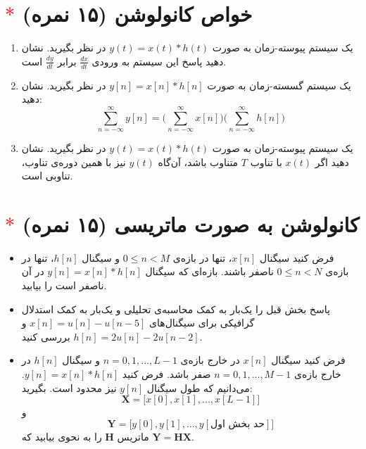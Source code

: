 \documentclass[a4paper]{article}
\begin{document}
	\large
	
	\section{ \textcolor{red}{$\ast$} 
		خواص کانولوشن (۱۵ نمره)
	}
	\begin{enumerate}
		\item 
		یک سیستم پیوسته-زمان به صورت 
		$y(t) = x(t)*h(t)$	
		در نظر بگیرید. نشان دهید پاسخ این سیستم به ورودی 
		$\frac{dx}{dt}$
		برابر
		$\frac{dy}{dt}$
		است. 
		
		\item
		یک سیستم گسسته-زمان به صورت  
		$y[n] = x[n]*h[n]$	
		در نظر بگیرید. نشان دهید:
		$$\sum_{n=-\infty}^{\infty}y[n] = 
		\Big(\sum_{n=-\infty}^{\infty}x[n]\Big)\Big(\sum_{n=-\infty}^{\infty}h[n]\Big)
		$$
		
		\item 
		یک سیستم پیوسته-زمان به صورت 
		$y(t) = x(t)*h(t)$
		در نظر بگیرید. نشان دهید اگر 
		$x(t)$
		با تناوب $T$ متناوب باشد، آن‌گاه $y(t)$  نیز با همین دوره‌ی تناوب، تناوبی است.
		
	\end{enumerate}
	
	\section{ \textcolor{red}{$\ast$} 
		کانولوشن به صورت ماتریسی
		(۱۵ نمره)
	}
	\begin{itemize}
		\item
		فرض کنید سیگنال $x[n]$،  تنها در بازه‌ی 
		$0\leq n <M$
		و سیگنال $h[n]$، تنها در بازه‌ی 
		$0\leq n <N$
		ناصفر باشند. بازه‌‌ای که سیگنال 
		$y[n] = x[n]*h[n]$
		در آن ناصفر است را بیابید.
		\item
		پاسخ بخش قبل را یک‌بار به کمک محاسبه‌ی تحلیلی و یک‌بار به کمک استدلال گرافیکی برای سیگنال‌های 
		$x[n] = u[n] - u[n-5]$
		و
		$h[n] = 2u[n] - 2u[n-2]$
		بررسی کنید.
		
		\item
		فرض کنید سیگنال   $x[n]$ در خارج بازه‌ی  
		$n = 0, 1,...,L-1$
		و 
		سیگنال 
		$h[n]$
		در خارج بازه‌ی 
		$n = 0, 1,...,M-1$
		صفر باشد. فرض کنید 
		$y[n] = x[n] * h[n]$.
		می‌دانیم که طول سیگنال $y[n]$ نیز محدود است. بگیرید:
		$$\mathbf{X} = \Big[x[0], x[1],..., x[L-1]\Big]$$
		و 
		$$\mathbf{Y} = \Big[y[0], y[1],..., y[\textrm{حد بخش اول}]\Big]$$
		ماتریس 
		$\mathbf{H}$
		را به نحوی بیابید که 
		$\mathbf{Y} = \mathbf{H}\mathbf{X}$.
		
	\end{itemize}
	
\end{document}
